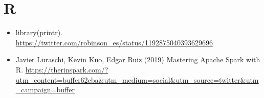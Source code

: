 \documentclass[]{book}
\providecommand{\tightlist}{%
  \setlength{\itemsep}{0pt}\setlength{\parskip}{0pt}}
\begin{document}
\hypertarget{r}{%
\section{R}\label{r}}

\begin{itemize}
\tightlist
\item
  library(printr). \url{https://twitter.com/robinson_es/status/1192875040393629696}
\item
  Javier Luraschi, Kevin Kuo, Edgar Ruiz (2019) Mastering Apache Spark with R. \url{https://therinspark.com/?utm_content=buffer62cba\&utm_medium=social\&utm_source=twitter\&utm_campaign=buffer}
\end{itemize}


\end{document}

